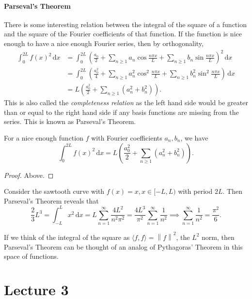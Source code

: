 \documentclass[a4paper]{article}
\begin{document}
\subsection{Parseval's Theorem}
There is some interesting relation between the integral of the square of a function and the square of the Fourier coefficients of that function.
If the function is nice enough to have a nice enough Fourier series, then by orthogonality,
\begin{align*}
    \int_0^{2L}f(x)^2\,\mathrm dx&=\int_0^{2L}\left( \frac{a_0}{2}+\sum_{n\ge 1}a_n\cos\frac{n\pi x}{L}+\sum_{n\ge 1}b_n\sin\frac{n\pi x}{L} \right)^2\,\mathrm dx\\
    &=\int_0^{2L}\left( \frac{a_0^2}{4}+\sum_{n\ge 1}a_n^2\cos^2\frac{n\pi x}{L}+\sum_{n\ge 1}b_n^2\sin^2\frac{n\pi x}{L} \right)\,\mathrm dx\\
    &=L\left( \frac{a_0^2}{2}+\sum_{n\ge 1}(a_n^2+b_n^2) \right).
\end{align*}
This is also called the \textit{completeness relation} as the left hand side would be greater than or equal to the right hand side if any basis functions are missing from the series.
This is known as Parseval's Theorem.
\begin{theorem}\label{parseval}
    For a nice enough function $f$ with Fourier coefficients $a_n,b_n$, we have
    \begin{equation}
        \int_0^{2L}f(x)^2\,\mathrm dx=L\left( \frac{a_0^2}{2}+\sum_{n\ge 1}(a_n^2+b_n^2) \right).
    \end{equation}
\end{theorem}
\begin{proof}
    Above.
\end{proof}
\begin{example}
    Consider the sawtooth curve with $f(x)=x,x\in[-L,L)$ with period $2L$.
    Then Parseval's Theorem reveals that
    $$\frac{2}{3}L^3=\int_{-L}^Lx^2\,\mathrm dx=L\sum_{n=1}^\infty\frac{4L^2}{n^2\pi^2}=\frac{4L^3}{\pi^2}\sum_{n=1}^\infty\frac{1}{n^2}\implies \sum_{n=1}^\infty\frac{1}{n^2}=\frac{\pi^2}{6}.$$
\end{example}
\begin{remark}
    If we think of the integral of the square as $ \langle f,f \rangle = \left\| f \right\| ^2  $, the $ L^2 $ norm, then Parseval's Theorem can be thought of an analog of Pythagoras' Theorem in this space of functions.
\end{remark}
\newpage
\part*{Lecture 3}
\end{document}
